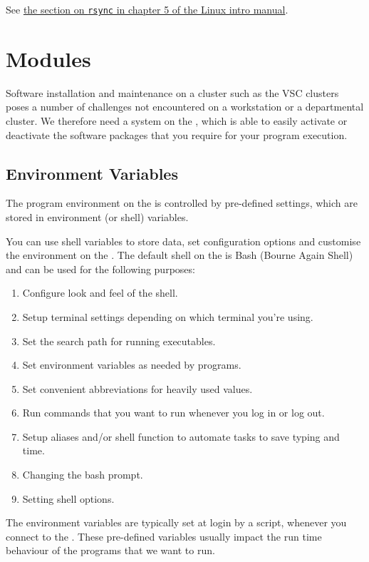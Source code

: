 See \href{\LinuxManualURL#sec:rsync}{the section on \texttt{rsync} in chapter 5 of the Linux intro manual}.

\section{Modules}
\label{sec:modules}

Software installation and maintenance on a \hpc cluster such as the VSC
clusters poses a number of challenges not encountered on a workstation or a
departmental cluster. We therefore need a system on the \hpc, which is able
to easily activate or deactivate the software packages that you require for
your program execution.

\subsection{Environment Variables}

The program environment on the \hpc is controlled by pre-defined settings,
which are stored in environment (or shell) variables.

You can use shell variables to store data, set configuration options and
customise the environment on the \hpc. The default shell
on the \hpc is Bash (Bourne Again Shell) and can be used for the
following purposes:

\begin{enumerate}
\item  Configure look and feel of the shell.
\item  Setup terminal settings depending on which terminal you're using.
\item  Set the search path for running executables.
\item  Set environment variables as needed by programs.
\item  Set convenient abbreviations for heavily used values.
\item  Run commands that you want to run whenever you log in or log out.
\item  Setup aliases and/or shell function to automate tasks to save typing and time.
\item  Changing the bash prompt.
\item  Setting shell options.
\end{enumerate}

The environment variables are typically set at login by a script, whenever you
connect to the \hpc. These pre-defined variables usually impact the run time
behaviour of the programs that we want to run.

